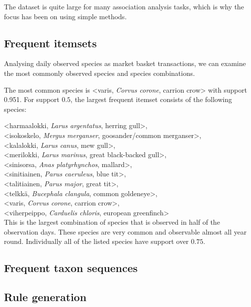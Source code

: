 \documentclass[english]{tktltiki2}
\begin{document}
The dataset is quite large for many association analysis tasks, which is why the focus has been on using simple methods.


\subsection{Frequent itemsets}

Analysing daily observed species as market basket transactions, we can examine the most commonly observed species and species combinations.

The most common species is <varis, \emph{Corvus corone}, carrion crow> with support 0.951. For support $0.5$, the largest frequent itemset consists of the following species:

\hangindent=0.7cm
<harmaalokki, \emph{Larus argentatus}, herring gull>, \\
<isokoskelo, \emph{Mergus merganser}, goosander/common merganser>, \\
<kalalokki, \emph{Larus canus}, mew gull>, \\
<merilokki, \emph{Larus marinus}, great black-backed gull>, \\
<sinisorsa, \emph{Anas platyrhynchos}, mallard>, \\
<sinitiainen, \emph{Parus caeruleus}, blue tit>, \\
<talitiainen, \emph{Parus major}, great tit>, \\
<telkkä, \emph{Bucephala clangula}, common goldeneye>, \\
<varis, \emph{Corvus corone}, carrion crow>, \\
<viherpeippo, \emph{Carduelis chloris}, european greenfinch> \\

This is the largest combination of species that is observed in half of the observation days. These species are very common and observable almost all year round. Individually all of the listed species have support over $0.75$.


\subsection{Frequent taxon sequences}


\subsection{Rule generation}
\end{document}
